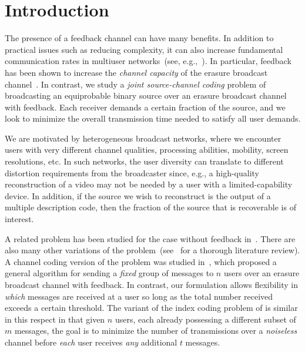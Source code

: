 \section{Introduction\label{sec:intro}}

The presence of a feedback channel can have many benefits.  In addition to practical issues such as reducing complexity, it can also increase fundamental communication rates in multiuser networks~(see, e.g.,~\cite{OzarowCheong84,Cover_TIT98}).  In particular, feedback has been shown to increase the \emph{channel capacity} of the erasure broadcast channel~\cite{GGT,WangHan14}.  In contrast, we study a \emph{joint source-channel coding} problem of broadcasting an equiprobable binary source over an erasure broadcast channel with feedback.  Each receiver demands a certain fraction of the source, and we look to minimize the overall transmission time needed to satisfy all user demands.  


We are motivated by heterogeneous broadcast networks, where we encounter users with very different channel qualities, processing abilities, mobility, screen resolutions, etc. In such networks, the user diversity can translate to different distortion requirements from the broadcaster since, e.g., a high-quality reconstruction of a video may not be needed by a user with a  limited-capability device.  In addition, if the source we wish to reconstruct is the output of a multiple description code, then the fraction of the source that is recoverable is of interest.

A related problem has been studied for the case without feedback in~\cite{TLKS_TIT16}.  There are also many other variations of the problem~(see~\cite{LTDM} for a thorough literature review).  A channel coding version of the problem was studied in~\cite{GGT}, which proposed a general algorithm for sending a \emph{fixed} group of messages to $n$ users over an erasure broadcast channel with feedback.  In contrast, our formulation allows flexibility in \emph{which} messages are received at a user so long as the total number received exceeds a certain threshold.  The variant of the index coding problem of \cite{BF_ISIT13} is similar in this respect in that given $n$ users, each already possessing a different subset of $m$ messages, the goal is to minimize the number of transmissions over a \emph{noiseless} channel before \emph{each} user receives \emph{any} additional $t$ messages.  

